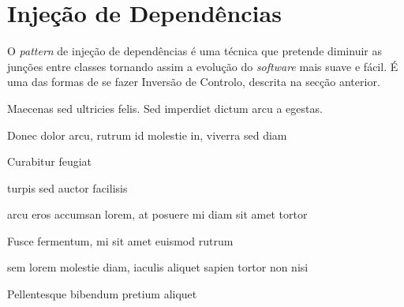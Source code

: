 \section{Injeção de Dependências}

O \textit{pattern} de injeção de dependências é uma técnica que pretende diminuir as junções entre classes tornando assim a evolução do \textit{software} mais suave e fácil. É uma das formas de se fazer Inversão de Controlo, descrita na secção anterior.




Maecenas sed ultricies felis. Sed imperdiet dictum arcu a egestas.
\begin{compactitem}
\item Donec dolor arcu, rutrum id molestie in, viverra sed diam
\item Curabitur feugiat
\item turpis sed auctor facilisis
\item arcu eros accumsan lorem, at posuere mi diam sit amet tortor
\item Fusce fermentum, mi sit amet euismod rutrum
\item sem lorem molestie diam, iaculis aliquet sapien tortor non nisi
\item Pellentesque bibendum pretium aliquet
\end{compactitem}
\lipsum[4] %
